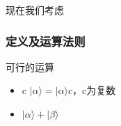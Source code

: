 \documentclass{book}
\begin{document}
现在我们考虑





\subsubsection{定义及运算法则}
可行的运算
\begin{itemize}
    \item c $|\alpha \rangle = |\alpha \rangle c$，c为复数
    \item $|\alpha \rangle + |\beta\rangle$
\end{itemize}
\end{document}
